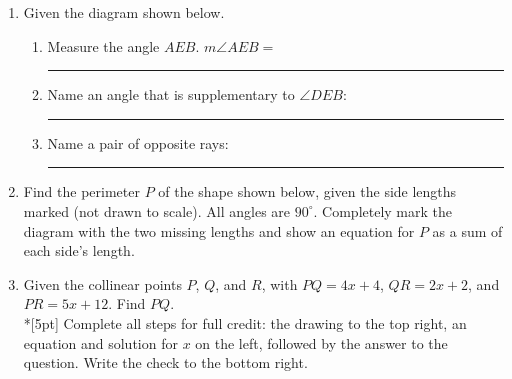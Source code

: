 \documentclass[12pt, twoside]{article}
\begin{document}
\begin{enumerate}
\item Given the diagram shown below. \vspace{0.25cm}
  \begin{enumerate}
    \item  Measure the angle $AEB$. $m \angle AEB = $ \rule{4cm}{0.15mm} \bigskip
    \item Name an angle that is supplementary to $\angle DEB$: \rule{4cm}{0.15mm} \bigskip
    \item Name a pair of opposite rays: \rule{4cm}{0.15mm}
  \end{enumerate}
  \vspace{1cm}
  \begin{center}
  \end{center}
  
   \newpage 

\item Find the perimeter $P$ of the shape shown below, given the side lengths marked (not drawn to scale). All angles are $90^\circ$. Completely mark the diagram with the two missing lengths and show an equation for $P$ as a sum of each side's length.
   \vspace{1cm} 
   \begin{flushleft}
   \end{flushleft} \vspace{2cm}

\item Given the collinear points $P$, $Q$, and $R$, with $PQ=4x+4$, $QR=2x+2$, and $PR=5x+12$. Find ${PQ}$.\\*[5pt]
   Complete all steps for full credit: the drawing to the top right, an equation and solution for $x$ on the left, followed by the answer to the question. Write the check to the bottom right.
\vspace{4cm}

\end{enumerate}
\end{document}
